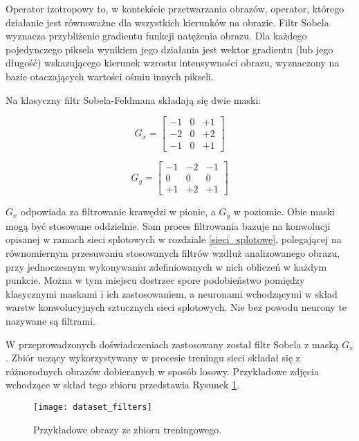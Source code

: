     Operator izotropowy to, w kontekście przetwarzania obrazów, operator, którego
    działanie jest równoważne dla wszystkich kierunków na obrazie. Filtr Sobela
    wyznacza przybliżenie gradientu funkcji natężenia obrazu. Dla każdego pojedynczego
    piksela wynikiem jego działania jest wektor gradientu (lub jego długość) wskazującego kierunek wzrostu
    intensywności obrazu, wyznaczony na bazie otaczających wartości ośmiu innych pikseli.

    Na klasyczny filtr Sobela-Feldmana składają się dwie maski:

    \begin{equation}
    G_x =
    \begin{bmatrix}
    -1 & 0 & +1 \\
    -2 & 0 & +2 \\
    -1 & 0 & +1
    \end{bmatrix}
  \end{equation}

    \begin{equation}
    G_y =
    \begin{bmatrix}
    -1 & -2 & -1 \\
    0 & 0 & 0 \\
    +1 & +2 & +1
    \end{bmatrix}
  \end{equation}

    $G_x$ odpowiada za filtrowanie krawędzi w pionie, a $G_y$ w poziomie. Obie maski
    mogą być stosowane oddzielnie. Sam proces filtrowania bazuje na konwolucji
    opisanej w ramach sieci splotowych w rozdziale \ref{sieci_splotowe}, polegającej na
    równomiernym przesuwaniu stosowanych filtrów wzdłuż analizowanego obrazu, przy
    jednoczesnym wykonywaniu zdefiniowanych w nich obliczeń w każdym punkcie. Można
    w tym miejscu dostrzec spore podobieństwo pomiędzy klasycznymi maskami i ich zastosowaniem,
    a neuronami wchodzącymi w skład warstw konwolucyjnych sztucznych sieci splotowych. Nie bez powodu
    neurony te nazywane są filtrami.

    W przeprowadzonych doświadczeniach zastosowany został filtr Sobela z
    maską $G_x$. Zbiór uczący wykorzystywany w procesie treningu sieci składał się
    z różnorodnych obrazów dobieranych w sposób losowy. Przykładowe zdjęcia wchodzące
    w skład tego zbioru przedstawia Rysunek \ref{fig:dataset_filters}.

    \begin{figure}[h!]
      \centering
      \texttt{[image: dataset\_filters]}
      \caption[Przykładowe obrazy ze zbioru treningowego - źródło: Rysunek własny]{Przykładowe obrazy ze zbioru treningowego.}
      \label{fig:dataset_filters}
    \end{figure}

